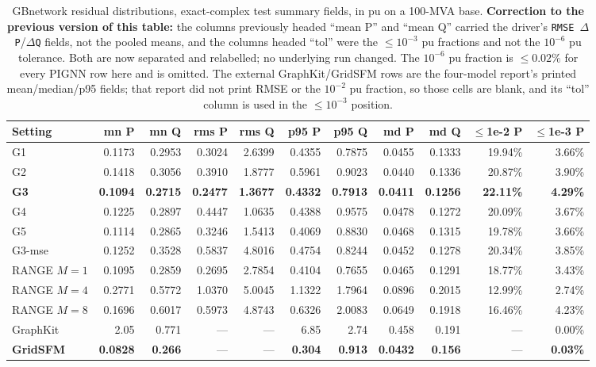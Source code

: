 \documentclass[10pt]{article}
\begin{document}
\begin{table}[H]
\centering\footnotesize
\setlength{\tabcolsep}{2.2pt}
\begin{tabular}{lrrrrrrrrrr}
\toprule
Setting & mn P & mn Q & rms P & rms Q & p95 P & p95 Q & md P & md Q & $\le$1e-2 P & $\le$1e-3 P\\
\midrule
G1 & 0.1173 & 0.2953 & 0.3024 & 2.6399 & 0.4355 & 0.7875 & 0.0455 & 0.1333 & 19.94\% & 3.66\%\\
G2 & 0.1418 & 0.3056 & 0.3910 & 1.8777 & 0.5961 & 0.9023 & 0.0440 & 0.1336 & 20.87\% & 3.90\%\\
\textbf{G3} & \textbf{0.1094} & \textbf{0.2715} & \textbf{0.2477} & \textbf{1.3677} & \textbf{0.4332} & \textbf{0.7913} & \textbf{0.0411} & \textbf{0.1256} & \textbf{22.11\%} & \textbf{4.29\%}\\
G4 & 0.1225 & 0.2897 & 0.4447 & 1.0635 & 0.4388 & 0.9575 & 0.0478 & 0.1272 & 20.09\% & 3.67\%\\
G5 & 0.1114 & 0.2865 & 0.3246 & 1.5413 & 0.4069 & 0.8830 & 0.0468 & 0.1315 & 19.78\% & 3.66\%\\
G3-mse & 0.1252 & 0.3528 & 0.5837 & 4.8016 & 0.4754 & 0.8244 & 0.0452 & 0.1278 & 20.34\% & 3.85\%\\
\midrule
RANGE $M{=}1$ & 0.1095 & 0.2859 & 0.2695 & 2.7854 & 0.4104 & 0.7655 & 0.0465 & 0.1291 & 18.77\% & 3.43\%\\
RANGE $M{=}4$ & 0.2771 & 0.5772 & 1.0370 & 5.0045 & 1.1322 & 1.7964 & 0.0896 & 0.2015 & 12.99\% & 2.74\%\\
RANGE $M{=}8$ & 0.1696 & 0.6017 & 0.5973 & 4.8743 & 0.6326 & 2.0083 & 0.0649 & 0.1918 & 16.46\% & 4.23\%\\
\midrule
GraphKit & 2.05 & 0.771 & --- & --- & 6.85 & 2.74 & 0.458 & 0.191 & --- & 0.00\%\\
\textbf{GridSFM} & \textbf{0.0828} & \textbf{0.266} & --- & --- & \textbf{0.304} & \textbf{0.913} & \textbf{0.0432} & \textbf{0.156} & --- & \textbf{0.03\%}\\
\bottomrule
\end{tabular}
\caption{GBnetwork residual distributions, exact-complex test summary fields,
in pu on a 100-MVA base.  \textbf{Correction to the previous version of this
table:} the columns previously headed ``mean P'' and ``mean Q'' carried the
driver's \texttt{RMSE $\Delta$P}/\texttt{$\Delta$Q} fields, not the pooled
means, and the columns headed ``tol'' were the $\le10^{-3}$ pu fractions and
not the $10^{-6}$ pu tolerance.  Both are now separated and relabelled; no
underlying run changed.  The $10^{-6}$ pu fraction is $\le0.02\%$ for every
PIGNN row here and is omitted.  The external GraphKit/GridSFM rows are the
four-model report's printed mean/median/p95 fields; that report did not print
RMSE or the $10^{-2}$ pu fraction, so those cells are blank, and its ``tol''
column is used in the $\le10^{-3}$ position.}
\end{table}
\end{document}
